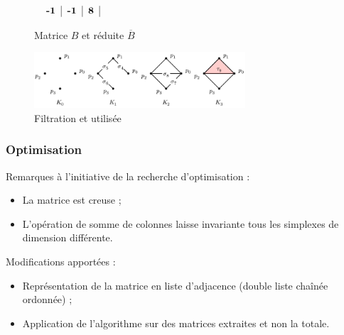 \documentclass{beamer}
\begin{document}
\begin{frame}
\begin{figure}
\begin{math}
\begin{array}{cc}
\begin{tabular}{ c | c | c | c | c | c | c }
                \textbf{-1} & \textbf{-1} & \textbf{8}
            \end{tabular}
        \end{array}
        \end{math}
        \caption{Matrice $B$ et réduite $\overline{B}$}
    \end{figure}
    \begin{figure}
        \centering
        \includegraphics[width=0.7\textwidth]{../images/filtration_horizontal.png}
        \caption{Filtration et utilisée}
    \end{figure}
\end{frame}

\begin{frame}
    \frametitle{Optimisation}
    Remarques à l'initiative de la recherche d'optimisation :
    \begin{itemize}
        \item La matrice est creuse ;
        \item L'opération de somme de colonnes laisse invariante tous les simplexes de dimension différente.
    \end{itemize}

    Modifications apportées :
    \begin{itemize}
        \item Représentation de la matrice en liste d'adjacence (double liste chaînée ordonnée) ;
        \item Application de l'algorithme sur des matrices extraites et non la totale.
    \end{itemize}
\end{frame}
\end{document}
